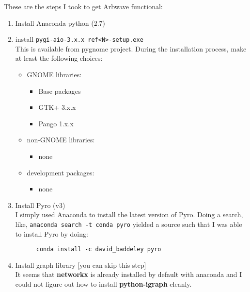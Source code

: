 These are the steps I took to get Arbwave functional:
\begin{enumerate}
  \item Install Anaconda python (2.7)
  \item install \verb|pygi-aio-3.x.x_ref<N>-setup.exe| \\
    This is available from pygnome project.
    During the installation process, make at least the following choices:
    \begin{itemize}
      \item GNOME libraries:
        \begin{itemize}
          \item Base packages
          \item GTK+ 3.x.x
          \item Pango 1.x.x
        \end{itemize}
      \item non-GNOME libraries:
        \begin{itemize}
          \item none
        \end{itemize}
      \item development packages:
        \begin{itemize}
          \item none
        \end{itemize}
    \end{itemize}

  \item Install Pyro (v3) \\
    I simply used Anaconda to install the latest version of Pyro.  Doing a
    search, like, \verb|anaconda search -t conda pyro| yielded a source such
    that I was able to install Pyro by doing:
    \begin{verbatim}
      conda install -c david_baddeley pyro
    \end{verbatim}

  \item Install graph library [you can skip this step] \\
    It seems that \textbf{networkx} is already installed by default with
    anaconda and I could not figure out how to install \textbf{python-igraph}
    cleanly.


\end{enumerate}
